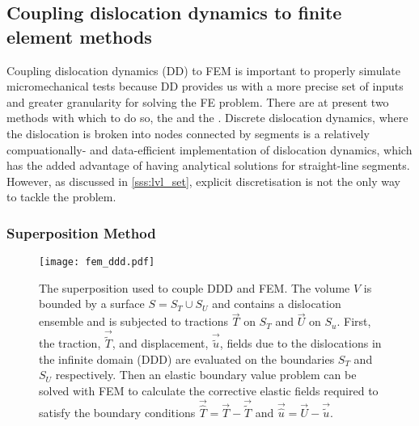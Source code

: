 \subsection{Coupling dislocation dynamics to finite element methods}
\label{ss:ddd_fem}

Coupling dislocation dynamics (DD) to FEM is important to properly simulate micromechanical tests because DD provides us with a more precise set of inputs and greater granularity for solving the FE problem. There are at present two methods with which to do so, the  and the . Discrete dislocation dynamics, where the dislocation is broken into nodes connected by segments is a relatively compuationally- and data-efficient implementation of dislocation dynamics, which has the added advantage of having analytical solutions for straight-line segments. However, as discussed in \cref{sss:lvl_set}, explicit discretisation is not the only way to tackle the problem.

\subsubsection{Superposition Method}
\label{sss:superposition}

\begin{figure}
    \centering
    \texttt{[image: fem\_ddd.pdf]}
    \caption[Superposition Method for DDD-FEM coupling.]{The superposition used to couple DDD and FEM. The volume $V$ is bounded by a surface $S = S_{T} \cup S_{U}$ and contains a dislocation ensemble and is subjected to tractions $\vec{T}$ on $S_{T}$ and $\vec{U}$ on $S_{u}$. First, the traction, $\vec{\tilde{T}}$, and displacement, $\vec{\tilde{u}}$, fields due to the dislocations in the infinite domain (DDD) are evaluated on the boundaries $S_{T}$ and $S_{U}$ respectively. Then an elastic boundary value problem can be solved with FEM to calculate the corrective elastic fields required to satisfy the boundary conditions $\vec{\hat{T}} = \vec{T} - \vec{\tilde{T}}$ and $\vec{\hat{u}} = \vec{U} - \vec{\tilde{u}}$.}
    \label{f:fem_ddd}
\end{figure}

